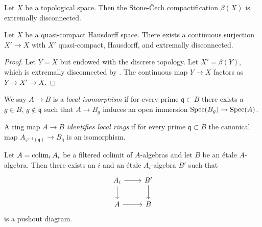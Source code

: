 \begin{theorem}
    Let \(X\) be a topological space. Then the Stone-Čech compactification \(\beta(X)\) is extremally disconnected.
    \label{thm:stone-cech-extremally-disconnected}
    \mathlibok
\end{theorem}

\begin{proposition}
  Let $X$ be a quasi-compact Hausdorff space. There exists a continuous surjection $X' \to X$ with $X'$ quasi-compact, Hausdorff, and extremally disconnected.
  \label{thm:extremally-disconnected-cover}
\end{proposition}

\begin{proof}
  Let $Y=X$ but endowed with the discrete topology. Let $X'=\beta (Y)$, which is extremally disconnected by . The continuous map $Y \to X$ factors as $Y \to X' \to X$.
\end{proof}

\begin{definition}
  \label{def:local-isomorphism}

  We say $A \to B$ is a \emph{local isomorphism} if for every prime $\mathfrak{q} \subset B$ there exists a $g \in B$, $g \notin \mathfrak{q}$ such that $A \to B_g$ induces an open immersion $\operatorname{Spec} (B_g) \to \operatorname{Spec} (A)$.
\end{definition}

\begin{definition}
  A ring map $A \to B$ \emph{identifies local rings} if for every prime $\mathfrak{q} \subset B$ the canonical map $A_{\varphi^{-1}(\mathfrak{q})} \to B_{\mathfrak{q}}$ is an isomorphism.
  \label{def:identify-local-rings}
\end{definition}

\begin{lemma}
    Let $A = \operatorname{colim}_i A_i$ be a filtered colimit of $A$-algebras and let $B$ be an étale $A$-algebra. Then
    there exists an $i$ and an étale $A_i$-algebra $B'$ such that
    \[
    \begin{tikzcd}
        A_i \arrow{r} \arrow{d} & B' \arrow{d} \\
        A \arrow{r} & B
    \end{tikzcd}
    \] is a pushout diagram.
    \label{lemma:etale-ind-spreads}
\end{lemma}

